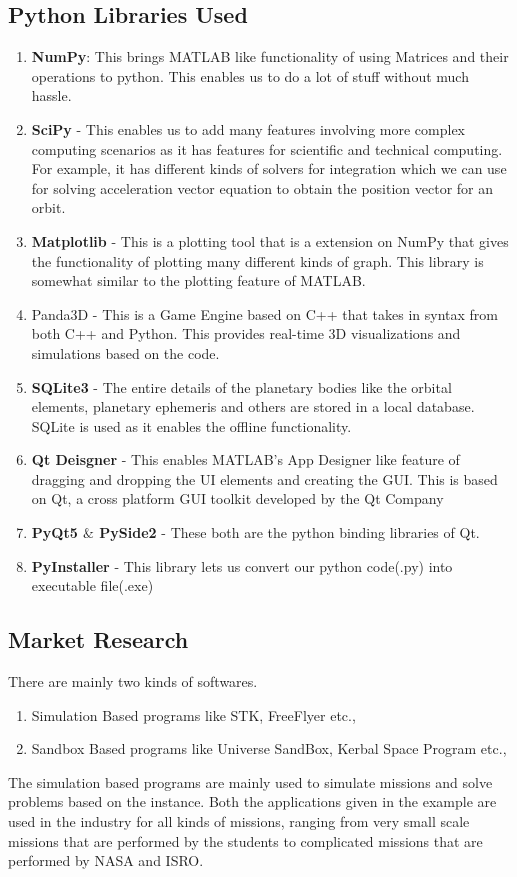\documentclass[12pt]{article}
\begin{document}
\subsection{Python Libraries Used}
\begin{enumerate}
\item \textbf{NumPy}:  This brings MATLAB like functionality of using Matrices and their operations to python. This enables us to do a lot of stuff without much hassle.
\item \textbf{SciPy} - This enables us to add many features involving more complex computing scenarios as it has features for scientific and technical computing. For example, it has different kinds of solvers for integration which we can use for solving acceleration vector equation to obtain the position vector for an orbit.
\item \textbf{Matplotlib} - This is a plotting tool that is a extension on NumPy that gives the functionality of plotting many different kinds of graph. This library is somewhat similar to the plotting feature of MATLAB.
\item Panda3D - This is a Game Engine based on C++ that takes in syntax from both C++ and Python. This provides real-time 3D visualizations and simulations based on the code.
\item \textbf{SQLite3} - The entire details of the planetary bodies like the orbital elements, planetary ephemeris and others are stored in a local database. SQLite is used as it enables the offline functionality.
\item \textbf{Qt Deisgner} - This enables MATLAB's App Designer like feature of dragging and dropping the UI elements and creating the GUI. This is based on Qt, a cross platform GUI toolkit developed by the Qt Company
\item \textbf{PyQt5 $\&$ PySide2} - These both are the python binding libraries of Qt.
\item \textbf{PyInstaller} - This library lets us convert our python code(.py) into executable file(.exe)
\end{enumerate}
\subsection{Market Research}
There are mainly two kinds of softwares.
\begin{enumerate}
\item Simulation Based programs like STK, FreeFlyer etc.,
\item Sandbox Based programs like Universe SandBox, Kerbal Space Program etc.,
\end{enumerate}
\hspace{4em}The simulation based programs are mainly used to simulate missions and solve problems based on the instance. Both the applications given in the example are used in the industry for all kinds of missions, ranging from very small scale missions that are performed by the students to complicated missions that are performed by NASA and ISRO.
\end{document}
